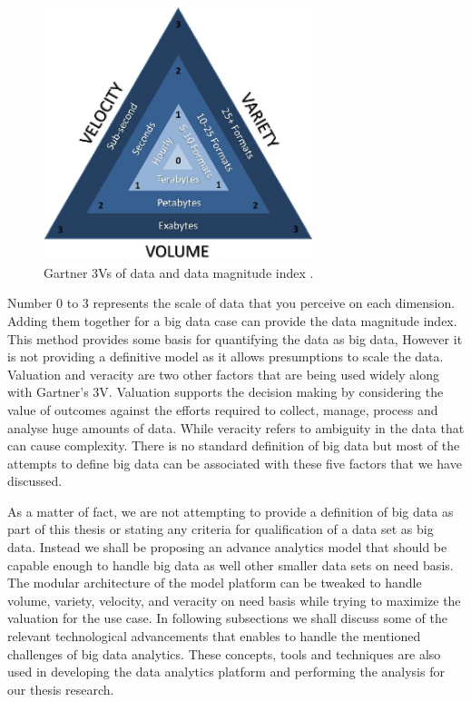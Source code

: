 \begin{figure}[ht]
  \begin{center}
    \includegraphics[width=0.7\textwidth]{images/3Vs.png}
    \caption{Gartner 3Vs of data and data magnitude index \cite{laney20013d}.}
    \label{fig:3Vs}
  \end{center}
\end{figure}

Number 0 to 3 represents the scale of data that you perceive on each dimension. Adding them together for a big data case can provide the data magnitude index. This method provides some basis for quantifying the data as big data, However it is not providing a definitive model as it allows presumptions to scale the data. Valuation and veracity are two other factors that are being used widely along with Gartner's 3V. Valuation supports the decision making by considering the value of outcomes against the efforts required to collect, manage, process and analyse huge amounts of data.  While veracity refers to ambiguity in the data that can cause complexity. There is no standard definition of big data but most of the attempts to define big data can be associated with these five factors that we have discussed.

As a matter of fact, we are not attempting to provide a definition of big data as part of this thesis or stating any criteria for qualification of a data set as big data. Instead we shall be proposing an advance analytics model that should be capable enough to handle big data as well other smaller data sets on need basis. The modular architecture of the model platform can be tweaked to handle volume, variety, velocity, and veracity on need basis while trying to maximize the valuation for the use case. In following subsections we shall discuss some of the relevant technological advancements that enables to handle the mentioned challenges of big data analytics. These concepts, tools and techniques are also used in developing the data analytics platform and performing the analysis for our thesis research.

